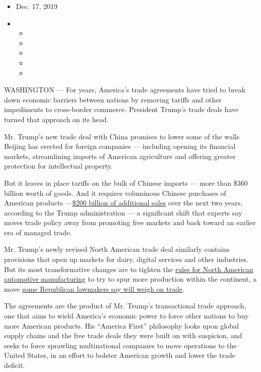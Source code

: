 \begin{itemize}
\item
  Dec. 17, 2019
\item
  \begin{itemize}
  \item
  \item
  \item
  \item
  \item
  \end{itemize}
\end{itemize}

WASHINGTON --- For years, America's trade agreements have tried to break
down economic barriers between nations by removing tariffs and other
impediments to cross-border commerce. President Trump's trade deals have
turned that approach on its head.

Mr. Trump's new trade deal with China promises to lower some of the
walls Beijing has erected for foreign companies --- including opening
its financial markets, streamlining imports of American agriculture and
offering greater protection for intellectual property.

But it leaves in place tariffs on the bulk of Chinese imports --- more
than \$360 billion worth of goods. And it requires voluminous Chinese
purchases of American products
---\href{https://www.nytimes.com/2019/12/13/business/economy/china-trade-deal.html}{\$200
billion of additional sales} over the next two years, according to the
Trump administration --- a significant shift that experts say moves
trade policy away from promoting free markets and back toward an earlier
era of managed trade.

Mr. Trump's newly revised North American trade deal similarly contains
provisions that open up markets for dairy, digital services and other
industries. But its most transformative changes are to tighten the
\href{https://www.nytimes.com/2019/12/11/business/nafta-usmca-auto-jobs.html}{rules
for North American automotive manufacturing} to try to spur more
production within the continent, a move
\href{https://www.nytimes.com/2019/12/01/us/politics/trump-trade-deal-usmca.html}{some
Republican lawmakers say will weigh on trade}.

The agreements are the product of Mr. Trump's transactional trade
approach, one that aims to wield America's economic power to force other
nations to buy more American products. His ``America First'' philosophy
looks upon global supply chains and the free trade deals they were built
on with suspicion, and seeks to force sprawling multinational companies
to move operations to the United States, in an effort to bolster
American growth and lower the trade deficit.

